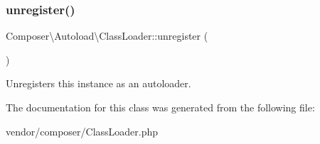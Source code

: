 \subsubsection{\texorpdfstring{unregister()}{unregister()}}
{\footnotesize\ttfamily Composer\textbackslash{}\+Autoload\textbackslash{}\+Class\+Loader\+::unregister (\begin{DoxyParamCaption}{ }\end{DoxyParamCaption})}

Unregisters this instance as an autoloader. 

The documentation for this class was generated from the following file\+:\begin{DoxyCompactItemize}
\item 
vendor/composer/Class\+Loader.\+php\end{DoxyCompactItemize}
